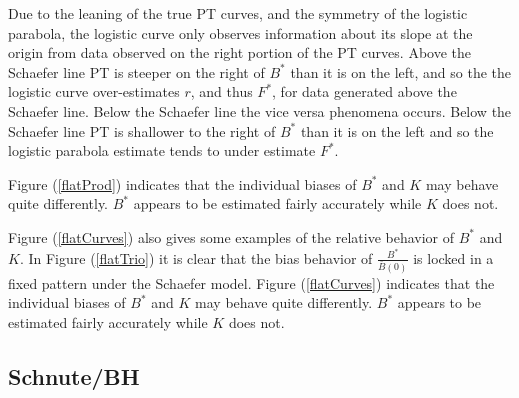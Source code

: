 \documentclass[12pt]{article}
\begin{document}
Due to the
leaning of the true PT curves, and the symmetry of the logistic parabola, the
logistic curve only observes information about its slope at the origin from
data observed on the right portion of the PT curves. Above the Schaefer line
PT is steeper on the right of $B^*$ than it is on the left, and so the the
logistic curve over-estimates $r$, and thus $F^*$, for data generated above
the Schaefer line. Below the Schaefer line the vice versa phenomena occurs.
Below the Schaefer line PT is shallower to the right of $B^*$ than it is on the
left and so the logistic parabola estimate tends to under estimate $F^*$.

%

Figure (\ref{flatProd}) indicates that the individual biases of $B^*$ and $K$
may behave quite differently. $B^*$ appears to be estimated fairly accurately
while $K$ does not.


Figure (\ref{flatCurves}) also gives some examples of the relative behavior of
$B^*$ and $K$. In Figure (\ref{flatTrio}) it is clear that the bias behavior of
$\frac{B^*}{\bar B(0)}$ is locked in a fixed pattern under the Schaefer model.
Figure (\ref{flatCurves}) indicates that the individual biases of $B^*$ and $K$
may behave quite differently. $B^*$ appears to be estimated fairly accurately
while $K$ does not.



%
\subsection{Schnute/BH}
\end{document}
